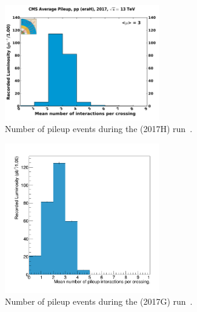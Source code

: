 \begin{figure}[htb]
\centering
  \includegraphics[width=0.6\textwidth]{plots/Data/pileup_pp_lowPU_2017.pdf}
  \caption{Number of pileup events during the \sh (2017H) run~\cite{LumiCalibTwiki}.}
  \label{fig:data:lumiPU13}
\end{figure}

\begin{figure}[htb]
\centering
  \includegraphics[width=0.6\textwidth]{plots/Data/pileup_5TeV.png}
  \caption{Number of pileup events during the \sg (2017G) run~\cite{LumiCalibTwiki}.}
  \label{fig:data:lumiPU5}
\end{figure}